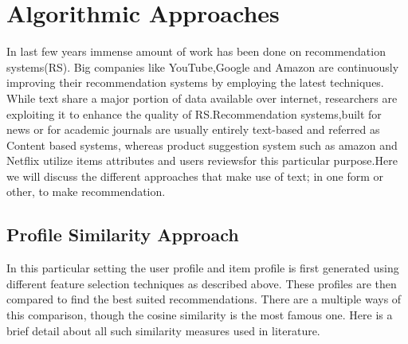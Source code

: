 
\section{Algorithmic Approaches}
In last few years immense amount of work has been done on recommendation systems(RS). Big companies like YouTube\cite{AddRef},Google\cite{AddRef} and Amazon\cite{amazon} are continuously improving their recommendation systems by employing the latest techniques. While text share a major portion of data available over internet, researchers are exploiting it to enhance the quality of RS.Recommendation systems,built for news or for academic journals are usually entirely text-based\cite{AddRef} and referred as Content based systems, whereas product suggestion system such as amazon and Netflix utilize items attributes\cite{AddRef} and users reviews\cite{AddRef}for this particular purpose.Here we will discuss the different approaches that make use of text; in one form or other, to make recommendation.
\subsection{Profile Similarity Approach}
In this particular setting the user profile and item profile is first generated using different feature selection techniques as described above. These profiles are then compared to find the best suited recommendations. There are a multiple ways of this comparison, though the cosine similarity is the most famous one. Here is a brief detail about all such similarity measures used in literature.

\pagebreak{}

\pagebreak{}

\pagebreak{}